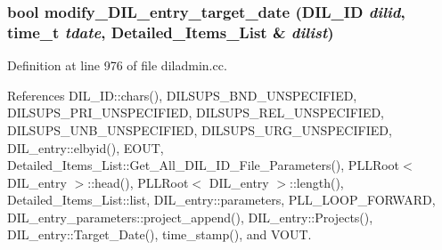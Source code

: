 \subsubsection{\setlength{\rightskip}{0pt plus 5cm}bool modify\_\-DIL\_\-entry\_\-target\_\-date ({\bf DIL\_\-ID} {\em dilid}, time\_\-t {\em tdate}, {\bf Detailed\_\-Items\_\-List} \& {\em dilist})}\label{diladmin_8cc_a15}




Definition at line 976 of file diladmin.cc.

References DIL\_\-ID::chars(), DILSUPS\_\-BND\_\-UNSPECIFIED, DILSUPS\_\-PRI\_\-UNSPECIFIED, DILSUPS\_\-REL\_\-UNSPECIFIED, DILSUPS\_\-UNB\_\-UNSPECIFIED, DILSUPS\_\-URG\_\-UNSPECIFIED, DIL\_\-entry::elbyid(), EOUT, Detailed\_\-Items\_\-List::Get\_\-All\_\-DIL\_\-ID\_\-File\_\-Parameters(), PLLRoot$<$ DIL\_\-entry $>$::head(), PLLRoot$<$ DIL\_\-entry $>$::length(), Detailed\_\-Items\_\-List::list, DIL\_\-entry::parameters, PLL\_\-LOOP\_\-FORWARD, DIL\_\-entry\_\-parameters::project\_\-append(), DIL\_\-entry::Projects(), DIL\_\-entry::Target\_\-Date(), time\_\-stamp(), and VOUT.



